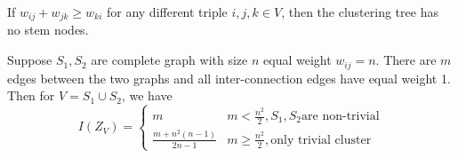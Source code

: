 \documentclass[portrait,final,archE,fontscale=0.3]{baposter}
\begin{document}
\begin{poster}
{\begin{multicols}{2}
If $w_{ij} + w_{jk} \geq w_{ki}$ for any different triple $i, j, k \in V$, then the clustering tree has no stem nodes.

Suppose $S_1, S_2 $ are complete graph with size $n$ equal weight $w_{ij}=n$. There are $m$ edges between the two graphs and all inter-connection edges have equal weight 1. Then for $V=S_1\cup S_2$, we have
\begin{equation*}
	I(Z_V) = \begin{cases}
		m & m <\frac{n^2}{2}, S_1,S_2 \textrm{are non-trivial} \\
		\frac{m+n^2(n-1)}{2n-1} & m\geq \frac{n^2}{2}, \textrm{only trivial cluster} 
	\end{cases}
\end{equation*}
	\end{multicols}
}

\end{poster}
\end{document}
